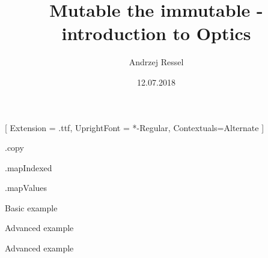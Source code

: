 \documentclass[xcolor={dvipsnames}]{beamer}
\title[Your Short Title]{Mutable the immutable - introduction to Optics}
\author{Andrzej Ressel}
\date{12.07.2018}
\begin{document}
[
Extension = .ttf, 
UprightFont = *-Regular,
Contextuals={Alternate}
]



\newcommand{\kt}[1]{
    \inputminted[fontsize=\scriptsize, 
                   linenos,
                   numbersep=8pt,
                   breaklines,
                   frame=lines,
                   bgcolor=bg,
                   framesep=3mm]{text}{#1}
}

\begin{frame}
  \titlepage
\end{frame}

\begin{frame}
    \begin{center}
        \Huge .copy
    \end{center}
    \begin{center}
        \Huge .mapIndexed
    \end{center}
    \begin{center}
        \Huge .mapValues
    \end{center}
\end{frame}

\begin{frame}[fragile]{Basic example}
    
\end{frame}

\begin{frame}[fragile, t]{Advanced example}
    
\end{frame}

\begin{frame}[fragile, t]{Advanced example}
    
\end{frame}

\begin{frame}[fragile]
    
\end{frame}

\begin{frame}[fragile]
    
\end{frame}
\end{document}
